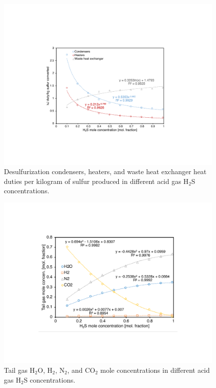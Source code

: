 \documentclass[11pt]{report}
\begin{document}
\begin{figure}
\includegraphics[width=1\columnwidth]{images/Claus_duty1.pdf}
\caption{Desulfurization condensers, heaters, and waste heat exchanger heat duties per kilogram of sulfur produced in different acid gas H$_2$S concentrations.}
\label{fig:Claus_duty1}
\end{figure}

\begin{figure}
\includegraphics[width=1\columnwidth]{images/Claus_concent1.pdf}
\caption{Tail gas H$_2$O, H$_2$, N$_2$, and CO$_2$ mole concentrations in different acid gas H$_2$S concentrations.}
\label{fig:Claus_concent1}
\end{figure}
\end{document}
